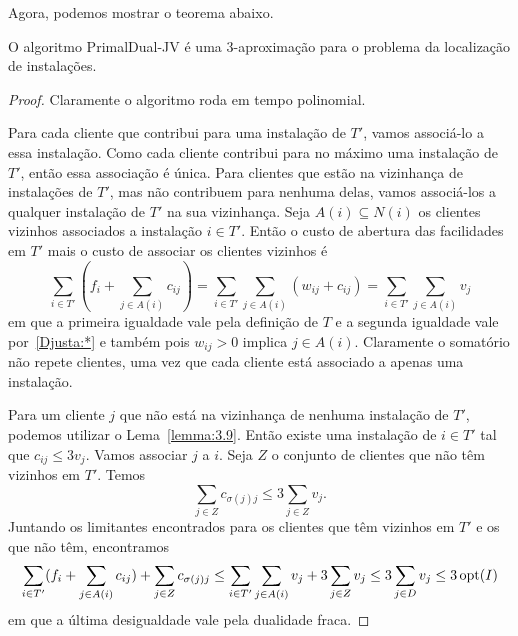 Agora, podemos mostrar o teorema abaixo.
\begin{theorem}
    O algoritmo {\sc PrimalDual-JV} é uma $3$-aproximação para o problema da localização de instalações.
\end{theorem}
\begin{proof}
    Claramente o algoritmo roda em tempo polinomial. 

    Para cada cliente que contribui para uma instalação de $T'$, vamos associá-lo a essa instalação. Como cada cliente contribui para no máximo uma instalação de $T'$, então essa associação é única. Para clientes que estão na vizinhança de instalações de $T'$, mas não contribuem para nenhuma delas, vamos associá-los a qualquer instalação de $T'$ na sua vizinhança.
    Seja $A(i) \subseteq N(i)$ os clientes vizinhos associados a instalação $i \in T'$. Então o custo de abertura das facilidades em $T'$ mais o custo de associar os clientes vizinhos é
    \[\sum_{i \in T'} (f_i + \sum_{j \in A(i)} c_{ij}) = \sum_{i \in T'} \sum_{j \in A(i)} (w_{ij} + c_{ij}) = \sum_{i \in T'} \sum_{j \in A(i)} v_j\]
    em que a primeira igualdade vale pela definição de $T$ e a segunda igualdade vale por~\eqref{Djusta:*} e também pois $w_{ij} > 0$ implica $j \in A(i)$. Claramente o somatório não repete clientes, uma vez que cada cliente está associado a apenas uma instalação.

    Para um cliente $j$ que não está na vizinhança de nenhuma instalação de $T'$, podemos utilizar o Lema~\ref{lemma:3.9}. Então existe uma instalação de $i \in T'$ tal que $c_{ij} \leq 3v_j$. Vamos associar $j$ a $i$. Seja $Z$ o conjunto de clientes que não têm vizinhos em $T'$. Temos
    \[\sum_{j \in Z}c_{\sigma(j)j} \leq 3\sum_{j \in Z}v_j.\]
    Juntando os limitantes encontrados para os clientes que têm vizinhos em $T'$ e os que não têm, encontramos
    \[\sum_{i \in T'} (f_i + \sum_{j \in A(i)} c_{ij}) + \sum_{j \in Z} c_{\sigma(j)j}\leq \sum_{i \in T'} \sum_{j \in A(i)} v_j + 3 \sum_{j \in Z} v_j \leq 3 \sum_{j \in D} v_j\leq 3\,\mathrm{opt}(I)\]
    em que a última desigualdade vale pela dualidade fraca.
\end{proof}